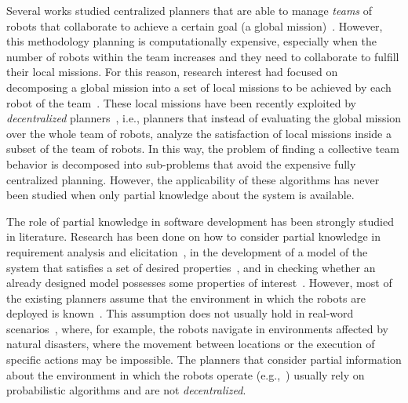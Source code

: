 Several works studied centralized planners that are able to manage \emph{teams} of robots that collaborate to achieve a certain goal (a global mission)~\cite{kloetzer2011multi,quottrup2004multi}.
However, this methodology planning is computationally expensive, especially when the number of robots within the team increases %
and they need to collaborate to fulfill their local missions.
For this reason, research interest had focused on decomposing a global mission into a set of local missions to be achieved by each robot of the team~\cite{schillinger2016decomposition,guo2015multi,tumova2016multi}. 
These local missions have been recently exploited by \emph{decentralized} planners~\cite{tumova2016multi}, i.e., planners that instead of evaluating the global mission over the whole team of robots, analyze the satisfaction of local missions inside a subset of the team of robots. 
In this way, the problem of finding a collective team behavior is decomposed into sub-problems that avoid the expensive fully centralized planning. 
However, the applicability of these algorithms has never been studied when only partial knowledge about the system is available.



The role of partial knowledge in software development has been strongly studied in literature.
Research has been done on how to consider partial knowledge in requirement analysis and elicitation~\cite{menghi2017integrating,menghi2017cover,letier2008deriving}, in the development of a model of the system that satisfies a set of desired properties~\cite{uchitel2009synthesis,uchitel2013supporting,famelis2012partial,albarghouthi2012under,Bernasconi2017}, and in checking   whether an  already designed model possesses some properties of interest~\cite{menghi2016dealing,bruns1999model,chechik2004multi}.
However, most of the existing planners assume that the environment in which the robots are deployed is known~\cite{7139412}. 
This assumption does not usually hold in real-word scenarios~\cite{lahijanian2016iterative},  where, for example,  the robots navigate in environments affected by natural disasters, where the movement between locations or the execution of specific actions may be impossible. %
The planners that consider  partial information about the environment in which the robots operate (e.g.,~\cite{roy2006planning,du2012robot,diaz2001exploring}) usually rely on probabilistic algorithms and are not  \emph{decentralized}.

